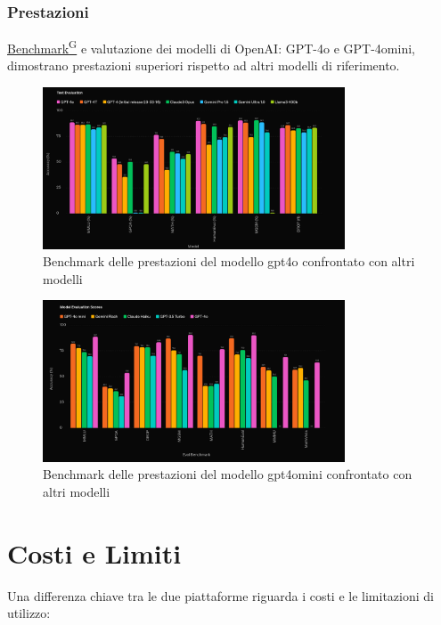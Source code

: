 \documentclass{article}
\begin{document}
\subsubsection{Prestazioni}
\href{https://code7crusaders.github.io/docs/RTB/documentazione_interna/glossario.html#benchmark}{Benchmark\textsuperscript{G}} e valutazione dei modelli di OpenAI: GPT-4o e GPT-4omini, dimostrano prestazioni superiori rispetto ad altri modelli di riferimento.

\begin{figure}[H]
    \centering
    \includegraphics[width=0.8\textwidth]{img/performance_benchmark_gpt4o.png}
    \caption{Benchmark delle prestazioni del modello gpt4o confrontato con altri modelli}
    \label{fig:performance_benchmark_gpt4o}
\end{figure}

\begin{figure}[H]
    \centering
    \includegraphics[width=0.8\textwidth]{img/performance_benchmark_gpt4omini.png}
    \caption{Benchmark delle prestazioni del modello gpt4omini confrontato con altri modelli}
    \label{fig:performance_benchmark_gpt4omini}
\end{figure}

\section{Costi e Limiti}
Una differenza chiave tra le due piattaforme riguarda i costi e le limitazioni di utilizzo:
\end{document}
